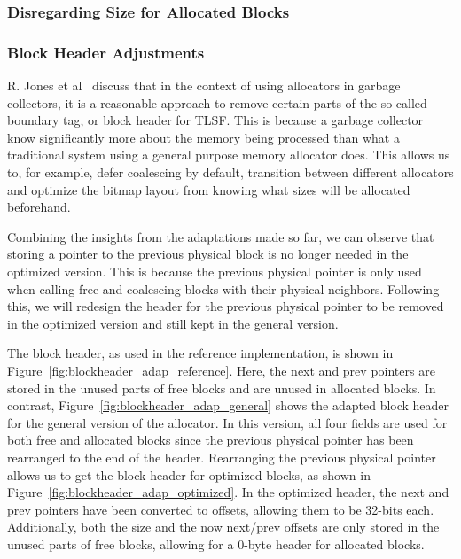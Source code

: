 \subsubsection{Disregarding Size for Allocated Blocks}

\subsubsection{Block Header Adjustments}

R. Jones et al~\cite[Page 103]{gchandbook} discuss that in the context of using allocators in garbage collectors, it is a reasonable approach to remove certain parts of the so called boundary tag, or block header for TLSF. This is because a garbage collector know significantly more about the memory being processed than what a traditional system using a general purpose memory allocator does. This allows us to, for example, defer coalescing by default, transition between different allocators and optimize the bitmap layout from knowing what sizes will be allocated beforehand.

Combining the insights from the adaptations made so far, we can observe that storing a pointer to the previous physical block is no longer needed in the optimized version. This is because the previous physical pointer is only used when calling free and coalescing blocks with their physical neighbors. Following this, we will redesign the header for the previous physical pointer to be removed in the optimized version and still kept in the general version. 


The block header, as used in the reference implementation, is shown in Figure~\ref{fig:blockheader_adap_reference}. Here, the next and prev pointers are stored in the unused parts of free blocks and are unused in allocated blocks. In contrast, Figure~\ref{fig:blockheader_adap_general} shows the adapted block header for the general version of the allocator. In this version, all four fields are used for both free and allocated blocks since the previous physical pointer has been rearranged to the end of the header. Rearranging the previous physical pointer allows us to get the block header for optimized blocks, as shown in Figure~\ref{fig:blockheader_adap_optimized}. In the optimized header, the next and prev pointers have been converted to offsets, allowing them to be 32-bits each. Additionally, both the size and the now next/prev offsets are only stored in the unused parts of free blocks, allowing for a 0-byte header for allocated blocks.

